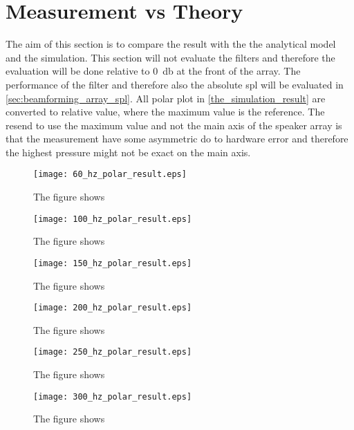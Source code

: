 \section{Measurement vs Theory}

The aim of this section is to compare the result with the the analytical model and the simulation. This section will not evaluate the filters and therefore the evaluation will be done relative to \SI{0}{\decibel} at the front of the array. The performance of the filter and therefore also the absolute \gls{spl} will be evaluated in \autoref{sec:beamforming_array_spl}. All polar plot in \autoref{the_simulation_result} are converted to relative value, where the maximum value is the reference. The resend to use the maximum value and not the main axis of the speaker array is that the measurement have some asymmetric do to hardware error and therefore the highest pressure might not be exact on the main axis. 



 \begin{figure}[H]
	\centering
	\texttt{[image: 60\_hz\_polar\_result.eps]}
	\caption{The figure shows}
		\label{fig:60_hz_polar_result}
\end{figure}

 \begin{figure}[H]
	\centering
	\texttt{[image: 100\_hz\_polar\_result.eps]}
	\caption{The figure shows}
		\label{fig:100_hz_polar_result}
\end{figure}

 \begin{figure}[H]
	\centering
	\texttt{[image: 150\_hz\_polar\_result.eps]}
	\caption{The figure shows}
		\label{fig:150_hz_polar_result}
\end{figure}

 \begin{figure}[H]
	\centering
	\texttt{[image: 200\_hz\_polar\_result.eps]}
	\caption{The figure shows}
		\label{fig:200_hz_polar_result}
\end{figure}


 \begin{figure}[H]
	\centering
	\texttt{[image: 250\_hz\_polar\_result.eps]}
	\caption{The figure shows}
		\label{fig:250_hz_polar_result}
\end{figure}

 \begin{figure}[H]
	\centering
	\texttt{[image: 300\_hz\_polar\_result.eps]}
	\caption{The figure shows}
		\label{fig:300_hz_polar_result}
\end{figure}







